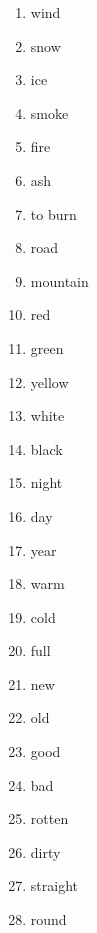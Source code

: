 \begin{enumerate}
\item   wind 

\item   snow 

\item   ice 

\item   smoke 

\item   fire 

\item   ash 

\item   to burn 

\item   road 

\item   mountain 

\item   red 

\item   green 

\item   yellow 

\item   white 

\item   black 

\item   night 

\item   day 

\item   year 

\item   warm 

\item   cold 

\item   full 

\item   new 

\item   old 

\item   good 

\item   bad 

\item   rotten 

\item   dirty 

\item   straight 

\item   round 


\end{enumerate}
